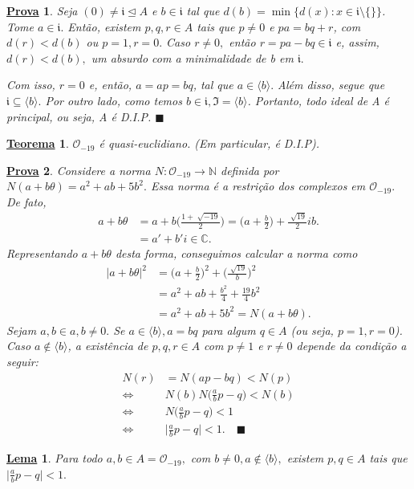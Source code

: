\documentclass{article}
\newtheorem*{theorem*}{\underline{Teorema}}
\newtheorem*{lemma*}{\underline{Lema}}
\newtheorem*{proof*}{\underline{Prova}}
\renewcommand\qedsymbol{$\blacksquare$}
\begin{document}
    \begin{proof*}
      Seja \((0)\neq \mathfrak{i}\trianglelefteq{A}\) e \(b\in \mathfrak{i}\) tal que \(d(b) = \min\{d(x):x\in \mathfrak{i}\setminus{\{\}}\}\).
      Tome \(a\in \mathfrak{i}.\) Então, existem \(p, q, r\in A\) tais que \(p\neq 0\) e \(pa = bq + r\), com \(d(r) < d(b)\) ou \(p=1, r=0.\)
      Caso \(r\neq 0,\) então \(r = pa-bq\in \mathfrak{i}\) e, assim, \(d(r) < d(b),\) um absurdo com a minimalidade de b em \(\mathfrak{i}.\)

      Com isso, \(r=0\) e, então, \(a = ap = bq\), tal que \(a\in \langle b \rangle.\) Além disso, segue que \(\mathfrak{i}\subseteq{\langle b \rangle}.\)
      Por outro lado, como temos \(b\in \mathfrak{i}, \mathfrak{I} = \langle b \rangle\). Portanto, todo ideal de A é principal, ou seja, A é D.I.P. \qedsymbol
    \end{proof*}
    \begin{theorem*}
      \(\mathcal{O}_{-19}\) é quasi-euclidiano. (Em particular, é D.I.P).
    \end{theorem*}
    \begin{proof*}
      Considere a norma \(N:\mathcal{O}_{-19}\rightarrow \mathbb{N}\) definida por \(N(a+b\theta ) = a^{2} + ab + 5b^{2}.\) Essa norma é a
      restrição dos complexos em \(\mathcal{O}_{-19}.\) De fato,
      \begin{align*}
        a + b\theta &= a +b \biggl(\frac{1+\sqrt[]{-19}}{2}\biggr) = \biggl(a + \frac{b}{2}\biggr) + \frac{\sqrt[]{19}}{2}ib.\\
                    &= a' + b'i\in \mathbb{C}.
      \end{align*}
      Representando \(a + b\theta \) desta forma, conseguimos calcular a norma como 
      \begin{align*}
        |a+b\theta |^{2} &= \biggl(a + \frac{b}{2}\biggr)^{2} + \biggl(\frac{\sqrt[]{19}}{b}\biggr)^{2}\\
                         &= a^{2} + ab + \frac{b^{2}}{4} + \frac{19}{4}b^{2}\\
                         &= a^{2} + ab + 5b^{2} = N(a + b\theta ).
      \end{align*}
      Sejam \(a, b\in a, b\neq0.\) Se \(a\in \langle b \rangle, a = bq\) para algum \(q\in A\) (ou seja, \(p=1, r = 0\)).
      Caso \(a\not\in \langle b \rangle\), a existência de \(p, q, r\in A\) com \(p\neq 1\) e \(r\neq 0\) depende da condição 
      a seguir:
      \begin{align*}
        N(r) &= N(ap-bq) < N(p)\\
        \Longleftrightarrow & N(b)N \biggl(\frac{a}{b}p - q\biggr) < N(b)\\
        \Longleftrightarrow & N \biggl(\frac{a}{b}p - q\biggr) < 1\\
        \Longleftrightarrow & \biggl|\frac{a}{b}p - q\biggr| < 1. \quad\text{\qedsymbol}
      \end{align*} 
    \end{proof*}
    \begin{lemma*}
      Para todo \(a, b\in A = \mathcal{O}_{-19},\) com \(b\neq0, a\not\in \langle b \rangle,\) existem \(p, q\in A\) tais que 
      \(\biggl|\frac{a}{b}p - q\biggr| < 1.\)
    \end{lemma*}
\end{document}
